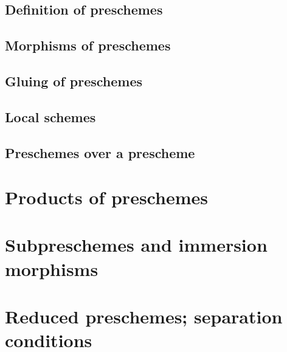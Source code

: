 \documentclass{book}
\begin{document}
        \subsection{Definition of preschemes}

        



        \subsection{Morphisms of preschemes}

        



        \subsection{Gluing of preschemes}

        



        \subsection{Local schemes}

        



        \subsection{Preschemes over a prescheme}

        



    \section{Products of preschemes}



    \section{Subpreschemes and immersion morphisms}



    \section{Reduced preschemes; separation conditions}
\end{document}
